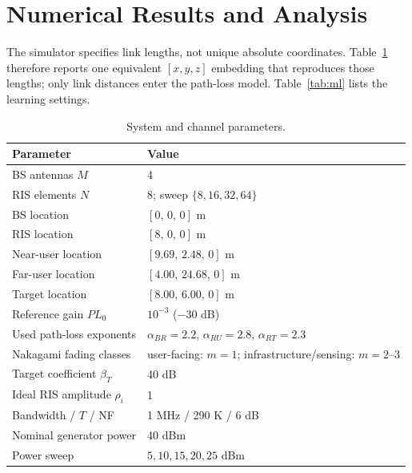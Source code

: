 \documentclass[10pt,journal]{IEEEtran}
\begin{document}
\section{Numerical Results and Analysis}
The simulator specifies link lengths, not unique absolute coordinates.
Table~\ref{tab:system} therefore reports one equivalent $[x,y,z]$ embedding that
reproduces those lengths; only link distances enter the path-loss model.
Table~\ref{tab:ml} lists the learning settings.

\begin{table}[t]
\centering
\caption{System and channel parameters.}
\label{tab:system}
\scriptsize
\setlength{\tabcolsep}{2.5pt}
\renewcommand{\arraystretch}{0.92}
\begin{tabular}{@{}ll@{}}
\toprule
Parameter & Value \\ \midrule
BS antennas $M$ & 4 \\
RIS elements $N$ & 8; sweep $\{8,16,32,64\}$ \\
BS location & $[0,\,0,\,0]$ m \\
RIS location & $[8,\,0,\,0]$ m \\
Near-user location & $[9.69,\,2.48,\,0]$ m \\
Far-user location & $[4.00,\,24.68,\,0]$ m \\
Target location & $[8.00,\,6.00,\,0]$ m \\
Reference gain $PL_0$ & $10^{-3}$ ($-30$ dB) \\
Used path-loss exponents & $\alpha_{BR}=2.2$, $\alpha_{RU}=2.8$, $\alpha_{RT}=2.3$ \\
Nakagami fading classes & user-facing: $m=1$; infrastructure/sensing: $m=2$--$3$ \\
Target coefficient $\beta_T$ & 40 dB \\
Ideal RIS amplitude $\rho_i$ & 1 \\
Bandwidth / $T$ / NF & 1 MHz / 290 K / 6 dB \\
Nominal generator power & 40 dBm \\
Power sweep & $5,10,15,20,25$ dBm \\
\bottomrule
\end{tabular}
\end{table}
\end{document}
